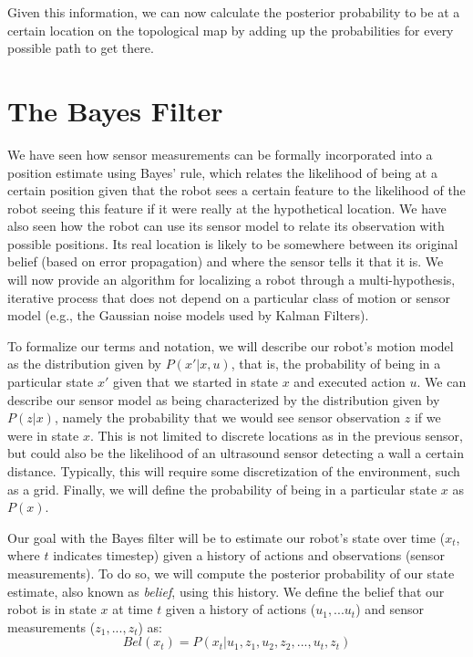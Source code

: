 Given this information, we can now calculate the posterior probability to be at a certain location on the topological map by adding up the probabilities for every possible path to get there.


\section{The Bayes Filter}
We have seen how sensor measurements can be formally incorporated into a position estimate using Bayes' rule, which relates the likelihood of being at a certain position given that the robot sees a certain feature to the likelihood of the robot seeing this feature if it were really at the hypothetical location. We have also seen how the robot can use its sensor model to relate its observation with possible positions. 
Its real location is likely to be somewhere between its original belief (based on error propagation) and where the sensor tells it that it is. We will now provide an algorithm for localizing a robot through a multi-hypothesis, iterative process that does not depend on a particular class of motion or sensor model (e.g., the Gaussian noise models used by Kalman Filters).

To formalize our terms and notation, we will describe our robot's motion model as the distribution given by $P(x'|x,u)$, that is, the probability of being in a particular state $x'$ given that we started in state $x$ and executed action $u$. We can describe our sensor model as being characterized by the distribution given by $P(z|x)$, namely the probability that we would see sensor observation $z$ if we were in state $x$. This is not limited to discrete locations as in the previous sensor, but could also be the likelihood of an ultrasound sensor detecting a wall a certain distance. Typically, this will require some discretization of the environment, such as a grid. Finally, we will define the probability of being in a particular state $x$ as $P(x)$. 

Our goal with the Bayes filter will be to estimate our robot's state over time ($x_t$, where $t$ indicates timestep) given a history of actions and observations (sensor measurements). To do so, we will compute the posterior probability of our state estimate, also known as \textsl{belief}, using this history. We define the belief that our robot is in state $x$ at time $t$ given a history of actions ($u_1,...u_t$) and sensor measurements ($z_1,...,z_t$) as:
$$
Bel(x_t) = P(x_t|u_1,z_1,u_2,z_2,...,u_t,z_t)
$$

